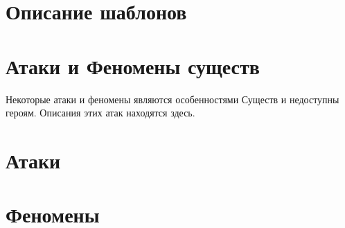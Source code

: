 \section{Описание шаблонов}

\section{Атаки и Феномены существ}
Некоторые атаки и феномены являются особенностями Существ и недоступны героям. Описания этих атак находятся здесь.
\section{Атаки}
\section{Феномены}
